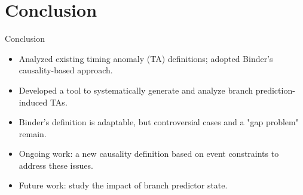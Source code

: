 \documentclass{beamer}
\begin{document}
\section{Conclusion}

\begin{frame}{Conclusion}
    \begin{itemize}
        \item Analyzed existing timing anomaly (TA) definitions; adopted Binder's causality-based approach.
        \item Developed a tool to systematically generate and analyze branch prediction-induced TAs.
        \item Binder's definition is adaptable, but controversial cases and a "gap problem" remain.
        \item Ongoing work: a new causality definition based on event constraints to address these issues.
        \item Future work: study the impact of branch predictor state.
    \end{itemize}
\end{frame}
\end{document}
